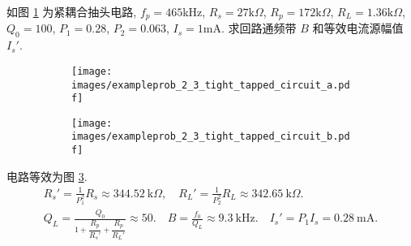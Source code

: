 \begin{exampleprob}
    如图 \ref{fig: 2.3 例题 紧耦合抽头电路} 为紧耦合抽头电路, $f_p=465$kHz, $R_s=27\mathrm{k}\Omega$, $R_p=172\mathrm{k}\Omega$, $R_L=1.36\mathrm{k}\Omega$, $Q_0=100$, $P_1=0.28$, $P_2=0.063$, $I_s=1$mA. 求回路通频带 $B$ 和等效电流源幅值 $I_s'$.

    \begin{figure}[H]
        \centering
        \begin{subfigure}{.45\textwidth}
            \centering
            \texttt{[image: images/exampleprob\_2\_3\_tight\_tapped\_circuit\_a.pdf]}
            \caption{}
            \label{fig: 2.3 例题 紧耦合抽头电路}
        \end{subfigure}
        \begin{subfigure}{.45\textwidth}
            \centering
            \texttt{[image: images/exampleprob\_2\_3\_tight\_tapped\_circuit\_b.pdf]}
            \caption{}
            \label{fig: 2.3 例题 紧耦合抽头电路 解}
        \end{subfigure}
    \end{figure}

    \begin{solution}
        电路等效为图 \ref{fig: 2.3 例题 紧耦合抽头电路 解}.
        \begin{gather*}
            R_s'=\frac{1}{P_1^2}R_s\approx 344.52\ \mathrm{k}\Omega,\quad R_L'=\frac{1}{P_2^2}R_L\approx 342.65\ \mathrm{k}\Omega. \\
            Q_L=\frac{Q_0}{1+\dfrac{R_p}{R_s'}+\dfrac{R_p}{R_L'}}\approx 50.\quad B=\frac{f_0}{Q_L}\approx 9.3\ \mathrm{kHz}.\quad I_s'=P_1I_s=0.28\ \mathrm{mA}.
        \end{gather*}
    \end{solution}
\end{exampleprob}
